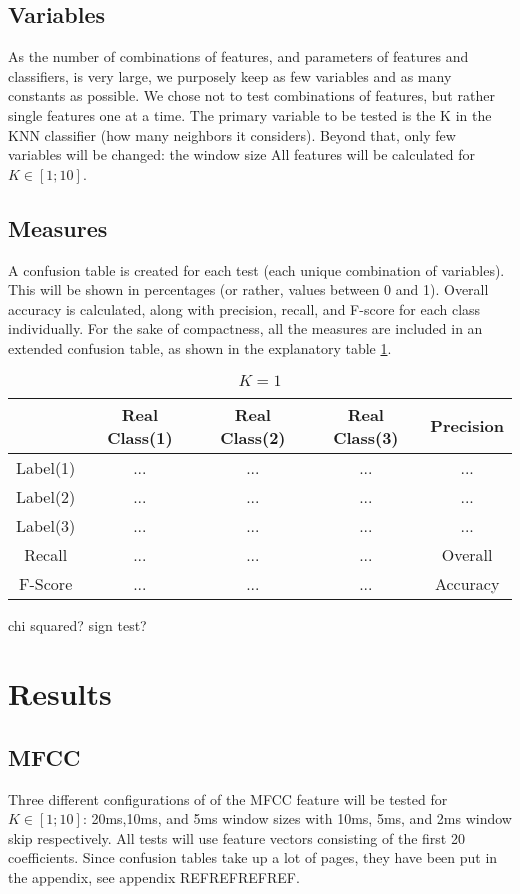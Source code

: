 	\subsection{Variables}
		As the number of combinations of features, and parameters of features and classifiers, is very large, we purposely keep as few variables and as many constants as possible. We chose not to test combinations of features, but rather single features one at a time.
		The primary variable to be tested is the K in the KNN classifier (how many neighbors it considers). Beyond that, only few variables will be changed: the window size
		All features will be calculated for $K \in [1;10]$.


	\subsection{Measures}
		A confusion table is created for each test (each unique combination of variables). This will be shown in percentages (or rather, values between 0 and 1). Overall accuracy is calculated, along with precision, recall, and F-score for each class individually.
		For the sake of compactness, all the measures are included in an extended confusion table, as shown in the explanatory table \ref{table:eval:explanatory}.

			\begin{table}
				\centering
				\begin{tabular}{|c | c | c | c | c |}
					\hline
					 & Real Class(1) & Real Class(2) & Real Class(3) & Precision\\ \hline
					Label(1)  & ... & ... & ... & ...\\ \hline
					Label(2)  & ... & ... & ... & ...\\ \hline
					Label(3) & ... & ... & ... & ...\\ \hline
					Recall   & ... & ... & ... & \multicolumn{1}{c}{Overall}\\ \cline{1-4}
					F-Score & ... & ... & ... & \multicolumn{1}{c}{Accuracy} \\ \cline{1-4}
				\end{tabular}
				\caption{$K=1$}
				\label{table:eval:explanatory}
			\end{table}
		chi squared?
		sign test?
 
\section{Results}

	\subsection{MFCC}
		Three different configurations of of the MFCC feature will be tested for $K \in [1;10]$: 20ms,10ms, and 5ms window sizes with 10ms, 5ms, and 2ms window skip respectively. All tests will use feature vectors consisting of the first 20 coefficients. Since confusion tables take up a lot of pages, they have been put in the appendix, see appendix REFREFREFREF. 
		
		
		
		
		
		
		
